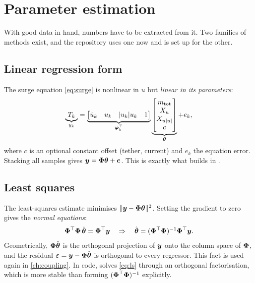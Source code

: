 \chapter{Parameter estimation}
\label{ch:estimation}

With good data in hand, numbers have to be extracted from it. Two families of methods
exist, and the repository uses one now and is set up for the other.

\section{Linear regression form}

The surge equation \eqref{eq:surge} is nonlinear in $u$ but \emph{linear in its parameters}:
\begin{equation}
  \underbrace{T_k}_{y_k} =
  \underbrace{\begin{bmatrix} \dot u_k & u_k & |u_k|u_k & 1 \end{bmatrix}}_{\boldsymbol{\varphi}_k^\top}
  \underbrace{\begin{bmatrix} m_\mathrm{tot} \\ X_u \\ X_{u|u|} \\ c \end{bmatrix}}_{\boldsymbol{\theta}}
  + e_k ,
  \label{eq:regression}
\end{equation}
where $c$ is an optional constant offset (tether, current) and $e_k$ the equation error.
Stacking all samples gives $\boldsymbol{y} = \boldsymbol{\Phi}\boldsymbol{\theta} + \boldsymbol{e}$. This is exactly
what  builds in .

\section{Least squares}

The least-squares estimate minimises $\lVert\boldsymbol{y} - \boldsymbol{\Phi}\boldsymbol{\theta}\rVert^2$. Setting
the gradient to zero gives the \emph{normal equations}:
\begin{equation}
  \boldsymbol{\Phi}^\top\boldsymbol{\Phi}\,\hat{\boldsymbol{\theta}} = \boldsymbol{\Phi}^\top\boldsymbol{y}
  \quad\Rightarrow\quad
  \hat{\boldsymbol{\theta}} = (\boldsymbol{\Phi}^\top\boldsymbol{\Phi})^{-1}\boldsymbol{\Phi}^\top\boldsymbol{y}.
  \label{eq:ls}
\end{equation}
Geometrically, $\boldsymbol{\Phi}\hat{\boldsymbol{\theta}}$ is the orthogonal projection of $\boldsymbol{y}$
onto the column space of $\boldsymbol{\Phi}$, and the residual
$\boldsymbol{\varepsilon} = \boldsymbol{y} - \boldsymbol{\Phi}\hat{\boldsymbol{\theta}}$ is orthogonal to every
regressor. This fact is used again in \cref{ch:coupling}. In code,
 solves \eqref{eq:ls} through an orthogonal factorisation, which is more
stable than forming $(\boldsymbol{\Phi}^\top\boldsymbol{\Phi})^{-1}$ explicitly.


